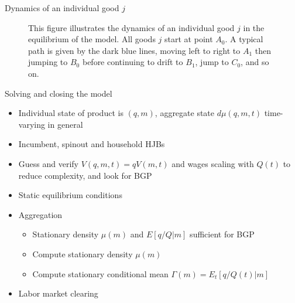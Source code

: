 \documentclass[english,usenames,dvipsnames]{beamer}
\begin{document}
\begin{frame}{Dynamics of an individual good $j$}
\begin{figure}
	\centering
	\resizebox{!}{.6\textheight}{}
	\caption{\scriptsize This figure illustrates the dynamics of an individual good $j$ in the equilibrium of the model. All goods $j$ start at point $A_0$. A typical path is given by the dark blue lines, moving left to right to $A_1$ then jumping to $B_0$ before continuing to drift to $B_1$, jump to $C_0$, and so on.}
	\label{individual_product_line_dynamics}
\end{figure}
\end{frame}

\begin{frame}{Solving and closing the model}\label{closing_the_model}
\small
\begin{itemize}
\item Individual state of product is $(q,m)$, aggregate state $d\mu(q,m,t)$ time-varying in general 
\item Incumbent, spinout and household HJBs \hyperlink{HJB_incumbent}{} \hyperlink{HJB_spinout}{} \hyperlink{HJB_household}{}
\item Guess and verify $V(q,m,t) = qV(m,t)$ and wages scaling with $Q(t)$ to reduce complexity, and look for BGP \hyperlink{scaling_of_value_functions}{}
\item Static equilibrium conditions \hyperlink{static_eq_conditions}{}
\item Aggregation 
\begin{itemize}
\item Stationary density $\mu(m)$ and $E[q/Q|m]$ sufficient for BGP \hyperlink{aggregate_distribution_and_bgp}{}
\item Compute stationary density $\mu(m)$  \hyperlink{aggregation}{}
\item Compute stationary conditional mean $\Gamma(m) = E_t[q/Q(t)|m]$ \hyperlink{aggregation}{}
\end{itemize}
\item Labor market clearing
\end{itemize}
\end{frame}
\end{document}
